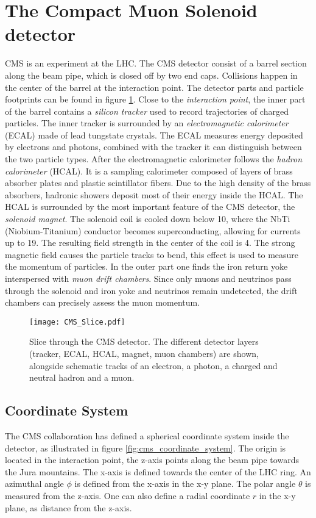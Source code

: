 \section{The Compact Muon Solenoid detector}
CMS is an experiment at the LHC. The CMS detector consist of a barrel section along the beam pipe, which is closed off by two end caps. Collisions happen in the center of the barrel at the interaction point. 
The detector parts and particle footprints can be found in figure \ref{fig:cms_slice}.
Close to the \emph{interaction point}, the inner part of the barrel contains a \emph{silicon tracker} used to record trajectories of charged particles. 
The inner tracker is surrounded by an \emph{electromagnetic calorimeter} (ECAL) made of lead tungstate crystals. The ECAL measures energy deposited by electrons and photons, combined with the tracker it can distinguish between the two particle types. 
After the electromagnetic calorimeter follows the \emph{hadron calorimeter} (HCAL). It is a sampling calorimeter composed of layers of brass absorber plates and plastic scintillator fibers. Due to the high density of the brass absorbers, hadronic showers deposit most of their energy inside the HCAL.
The HCAL is surrounded by the most important feature of the CMS detector, the \emph{solenoid magnet}. The solenoid coil is cooled down below \unit{10}{\kelvin}, where the NbTi (Niobium-Titanium) conductor becomes superconducting, allowing for currents up to \unit{19}{\kilo\ampere}. The resulting field strength in the center of the coil is \unit{4}{\tesla}. The strong magnetic field causes the particle tracks to bend, this effect is used to measure the momentum of particles.
In the outer part one finds the iron return yoke interspersed with \emph{muon drift chambers}. Since only muons and neutrinos pass through the solenoid and iron yoke and neutrinos remain undetected, the drift chambers can precisely assess the muon momentum.\cite{Co2008CMS}

\begin{figure}[htbp]
	\centering
	\texttt{[image: CMS\_Slice.pdf]}
	\caption{Slice through the CMS detector. The different detector layers (tracker, ECAL, HCAL, magnet, muon chambers) are shown, alongside schematic tracks of an electron, a photon, a charged and neutral hadron and a muon.\cite[modified]{Barney2011CMS}}
	\label{fig:cms_slice}
\end{figure}

\subsection{Coordinate System}
The CMS collaboration has defined a spherical coordinate system inside the detector, as illustrated in figure \ref{fig:cms_coordinate_system}. The origin is located in the interaction point, the z-axis points along the beam pipe towards the Jura mountains. The x-axis is defined towards the center of the LHC ring. An azimuthal angle $\phi$ is defined from the x-axis in the x-y plane. The polar angle $\theta$ is measured from the z-axis. One can also define a radial coordinate $r$ in the x-y plane, as distance from the z-axis.\cite[p. 2]{Co2008CMS} 


